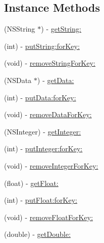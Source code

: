 \subsection*{Instance Methods}
\begin{DoxyCompactItemize}
\item 
(N\+S\+String $\ast$) -\/ \mbox{\hyperlink{protocol_i_open_dynamic_data_store_component_01-p_a62091f319f6fd60a92ad2b4281f88d8e}{get\+String\+:}}
\item 
(int) -\/ \mbox{\hyperlink{protocol_i_open_dynamic_data_store_component_01-p_a5864ed9b1a5a2d32add19644427cfcc0}{put\+String\+:for\+Key\+:}}
\item 
(void) -\/ \mbox{\hyperlink{protocol_i_open_dynamic_data_store_component_01-p_aeaa76e0de741838f0179301ce615305a}{remove\+String\+For\+Key\+:}}
\item 
(N\+S\+Data $\ast$) -\/ \mbox{\hyperlink{protocol_i_open_dynamic_data_store_component_01-p_ae66946455a2f9d57367ce8c77ae9d52f}{get\+Data\+:}}
\item 
(int) -\/ \mbox{\hyperlink{protocol_i_open_dynamic_data_store_component_01-p_a12c66ca2ebd8ce9758335c864ec9b844}{put\+Data\+:for\+Key\+:}}
\item 
(void) -\/ \mbox{\hyperlink{protocol_i_open_dynamic_data_store_component_01-p_aca935bd7c7d8993003f6d45be068a925}{remove\+Data\+For\+Key\+:}}
\item 
(N\+S\+Integer) -\/ \mbox{\hyperlink{protocol_i_open_dynamic_data_store_component_01-p_a193d8fc727f9122f7ab03eb8ea1b30b5}{get\+Integer\+:}}
\item 
(int) -\/ \mbox{\hyperlink{protocol_i_open_dynamic_data_store_component_01-p_ae5ef57168db6b83d3790e5606f08a752}{put\+Integer\+:for\+Key\+:}}
\item 
(void) -\/ \mbox{\hyperlink{protocol_i_open_dynamic_data_store_component_01-p_ade89315d7519b58b0fd0f26f957f747c}{remove\+Integer\+For\+Key\+:}}
\item 
(float) -\/ \mbox{\hyperlink{protocol_i_open_dynamic_data_store_component_01-p_abc03e2f993498fdca9c8b50d21a3ed25}{get\+Float\+:}}
\item 
(int) -\/ \mbox{\hyperlink{protocol_i_open_dynamic_data_store_component_01-p_aba3ce603ceabc769db3c830ac6b4c359}{put\+Float\+:for\+Key\+:}}
\item 
(void) -\/ \mbox{\hyperlink{protocol_i_open_dynamic_data_store_component_01-p_a42c94251f9f770412ba410fd7dadb610}{remove\+Float\+For\+Key\+:}}
\item 
(double) -\/ \mbox{\hyperlink{protocol_i_open_dynamic_data_store_component_01-p_ad9d6da922e5c310416c7c31e6d8e9d9b}{get\+Double\+:}}

\end{DoxyCompactItemize}
